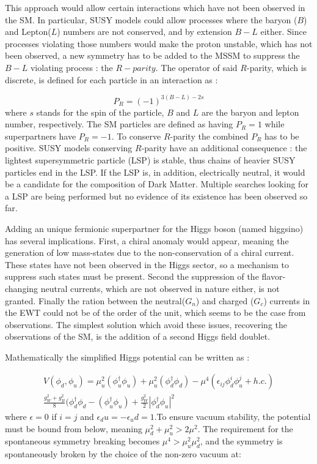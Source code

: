 This approach would allow certain interactions which have not been observed in the SM. In particular, SUSY models could allow processes where the baryon ($B$) and Lepton($L$) numbers are not conserved, and by extension $B - L$ either. Since processes violating those numbers would make the proton unstable, which has not been observed, a new symmetry has to be added to the MSSM to suppress the $B-L$ violating process : the $R-parity$. The operator of said $R$-parity, which is discrete, is defined for each particle in an interaction as :

\begin{equation}
    P_R = (-1)^{3(B-L)-2s}
\end{equation}
where $s$ stands for the spin of the particle, $B$ and $L$ are the baryon and lepton number, respectively. The SM particles are defined as having $P_R = 1$ while superpartners have $P_R = -1$. To conserve $R$-parity the combined $P_R$ has to be positive. SUSY models conserving $R$-parity have an additional consequence : the lightest supersymmetric particle (LSP) is stable, thus chains of heavier SUSY particles end in the LSP. If the LSP is, in addition, electrically neutral, it would be a candidate for the composition of Dark Matter. Multiple searches looking for a LSP are being performed but no evidence of its existence has been observed so far.\newline

Adding an unique fermionic superpartner for the Higgs boson (named higgsino) has several implications. First, a chiral anomaly would appear, meaning the generation of low mass-states due to the non-conservation of a chiral current. These states have not been observed in the Higgs sector, so a mechanism to suppress such states must be present. Second the suppression of the flavor-changing neutral currents, which are not observed in nature either, is not granted. Finally the ration between the neutral($G_n$) and charged ($G_c$) currents in the EWT could not be of the order of the unit, which seems to be the case from observations. The simplest solution which avoid these issues, recovering the observations of the SM, is the addition of a second Higgs field doublet.

Mathematically the simplified Higgs potential can be written as \cite{Nagashima:2014tva}:

\begin{multline}
    V(\phi_d , \phi_u) = \mu^{2}_u (\phi^{\dagger}_u \phi_u) + \mu^{2}_u (\phi^{\dagger}_d \phi_d) - \mu^{4}(\epsilon_{ij}\phi^{i}_d \phi^{j}_u + h.c.) \\ \frac{g^{2}_W + g^{2}_B}{8}(\phi^{\dagger}_d \phi_d - (\phi^{\dagger}_u \phi_u) + \frac{g^{2}_W}{2} | \phi^{\dagger}_d \phi_u |^2
\end{multline}
where $\epsilon = 0$ if $i = j$ and $\epsilon_du = -\epsilon_ud = 1$.To ensure vacuum stability, the potential must be bound from below, meaning $\mu_{d}^2 + \mu_{u}^2 > 2\mu^2$. The requirement for the spontaneous symmetry breaking becomes $\mu^4 > \mu_{u}^2 \mu_{d}^2$, and the symmetry is spontaneously broken by the choice of the non-zero vacuum at:


